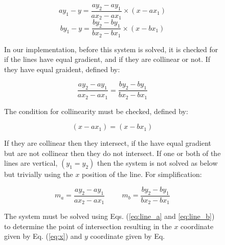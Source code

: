\documentclass[11pt,landscape]{article}
\begin{document}
\begin{multicols}{3}
\begin{figure}[H]
    \begin{mdframed}
        \begin{center}
            \begin{equation}
                ay_1-y = \frac{ay_2 - ay_1}{ax_2 - ax_1} \times (x - ax_1)
                \label{eq:line_a}
            \end{equation}
            \begin{equation}
                by_1-y = \frac{by_2 - by_1}{bx_2 - bx_1} \times (x - bx_1)
                \label{eq:line_b}
            \end{equation}
        \end{center}
    In our implementation, before this system is solved, it is checked for if
    the lines have equal gradient, and if they are collinear or not. If they
    have equal graident, defined by:
    \begin{center}
        \begin{equation*}
            \frac{ay_2 - ay_1}{ax_2 - ax_1} = \frac{by_2 - by_1}{bx_2 - bx_1}
        \end{equation*}
    \end{center}
    The condition for collinearity must be checked, defined by:
    \begin{center}
        \begin{equation*}
            (x - ax_1) = (x - bx_1)
        \end{equation*}
    \end{center}
    If they are collinear then they intersect, if the have equal gradient but
    are not collinear then they do not intersect. If one or both of the lines
    are vertical, $(y_1 = y_2)$ then the system is not solved as below but
    trivially using the $x$ position of the line.\vspace{0.5cm}
    \newline
    For simplification:
    \begin{center}
        \begin{equation*}
            m_a = \frac{ay_2 - ay_1}{ax_2 - ax_1} \hspace{1cm} m_b = \frac{by_2 - by_1}{bx_2 - bx_1}
        \end{equation*}
    \end{center}
    The system must be solved using Eqs. (\ref{eq:line_a} and
    \ref{eq:line_b}) to determine the point of intersection resulting in the $x$
    coordinate given by Eq. (\ref{eq:x}) and $y$ coordinate given by Eq.

\end{mdframed}
\end{figure}
\end{multicols}
\end{document}
